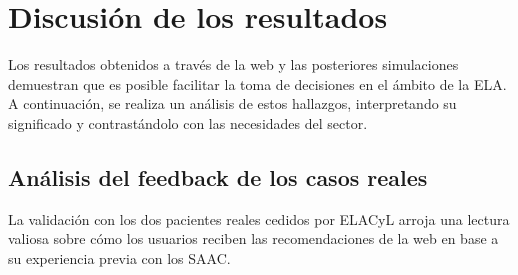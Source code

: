 
\section{Discusión de los resultados}

Los resultados obtenidos a través de la web y las posteriores simulaciones demuestran que es posible facilitar la toma de decisiones en el ámbito de la ELA. A continuación, se realiza un análisis de estos hallazgos, interpretando su significado  y contrastándolo con las necesidades del sector.

\subsection{Análisis del feedback de los casos reales}
La validación con los dos pacientes reales cedidos por ELACyL arroja una lectura valiosa sobre cómo los usuarios reciben las recomendaciones de la web en base a su experiencia previa con los SAAC. 


